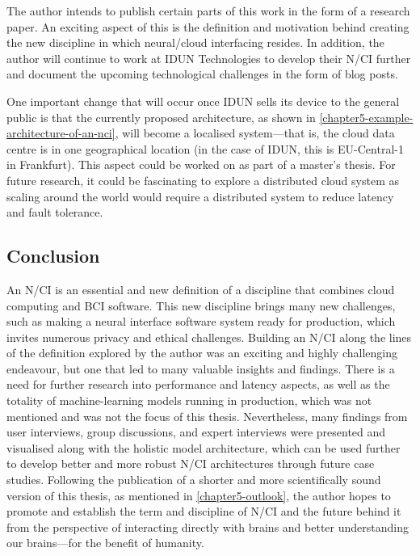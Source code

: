 The author intends to publish certain parts of this work in the form of a research paper. An exciting aspect of this is the definition and motivation behind creating the new discipline in which neural/cloud interfacing resides. In addition, the author will continue to work at IDUN Technologies to develop their N/CI further and document the upcoming technological challenges in the form of blog posts.

One important change that will occur once IDUN sells its device to the general public is that the currently proposed architecture, as shown in \autoref{chapter5-example-architecture-of-an-nci}, will become a localised system—that is, the cloud data centre is in one geographical location (in the case of IDUN, this is EU-Central-1 in Frankfurt). This aspect could be worked on as part of a master’s thesis. For future research, it could be fascinating to explore a distributed cloud system as scaling around the world would require a distributed system to reduce latency and fault tolerance.

\subsection{Conclusion}
\label{chapter5-conclusion}

An N/CI is an essential and new definition of a discipline that combines cloud computing and BCI software. This new discipline brings many new challenges, such as making a neural interface software system ready for production, which invites numerous privacy and ethical challenges. Building an N/CI along the lines of the definition explored by the author was an exciting and highly challenging endeavour, but one that led to many valuable insights and findings. There is a need for further research into performance and latency aspects, as well as the totality of machine-learning models running in production, which was not mentioned and was not the focus of this thesis. Nevertheless, many findings from user interviews, group discussions, and expert interviews were presented and visualised along with the holistic model architecture, which can be used further to develop better and more robust N/CI architectures through future case studies. Following the publication of a shorter and more scientifically sound version of this thesis, as mentioned in \autoref{chapter5-outlook}, the author hopes to promote and establish the term and discipline of N/CI and the future behind it from the perspective of interacting directly with brains and better understanding our brains—for the benefit of humanity.

